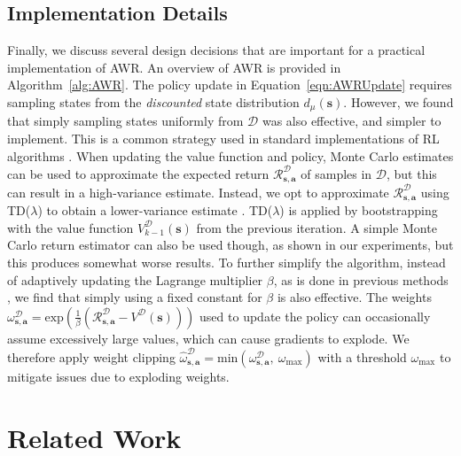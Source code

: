 \subsection{Implementation Details}

Finally, we discuss several design decisions that are important for a practical implementation of AWR. An overview of AWR is provided in Algorithm~\ref{alg:AWR}. The policy update in Equation~\ref{eqn:AWRUpdate} requires sampling states from the \emph{discounted} state distribution $d_\mu({\mathbf{s}})$. However, we found that simply sampling states uniformly from $\mathcal{D}$ was also effective, and simpler to implement. This is a common strategy used in standard implementations of RL algorithms \citep{baselines}. When updating the value function and policy, Monte Carlo estimates can be used to approximate the expected return $\mathcal{R}_{{\mathbf{s}},{\mathbf{a}}}^\mathcal{D}$ of samples in $\mathcal{D}$, but this can result in a high-variance estimate. Instead, we opt to approximate $\mathcal{R}_{{\mathbf{s}},{\mathbf{a}}}^\mathcal{D}$ using TD($\lambda$) to obtain a lower-variance estimate \citep{Sutton1998}. TD($\lambda$) is applied by bootstrapping with the value function $V_{k-1}^\mathcal{D}({\mathbf{s}})$ from the previous iteration. A simple Monte Carlo return estimator can also be used though, as shown in our experiments, but this produces somewhat worse results. To further simplify the algorithm, instead of adaptively updating the Lagrange multiplier $\beta$, as is done in previous methods \citep{Peters2007RWR,Peters2010REP,abdolmaleki2018maximum}, we find that simply using a fixed constant for $\beta$ is also effective. The weights $\omega_{{\mathbf{s}}, {\mathbf{a}}}^\mathcal{D} = \mathrm{exp}\left( \frac{1}{\beta} \left( \mathcal{R}_{{\mathbf{s}},{\mathbf{a}}}^\mathcal{D} - V^\mathcal{D}({\mathbf{s}}) \right) \right)$ used to update the policy can occasionally assume excessively large values, which can cause gradients to explode. We therefore apply weight clipping $\hat{\omega}_{{\mathbf{s}}, {\mathbf{a}}}^\mathcal{D} = \mathrm{min}\left(\omega_{{\mathbf{s}}, {\mathbf{a}}}^\mathcal{D}, \ \omega_{\max}\right)$ with a threshold $\omega_{\max}$ to mitigate issues due to exploding weights.

\section{Related Work}


